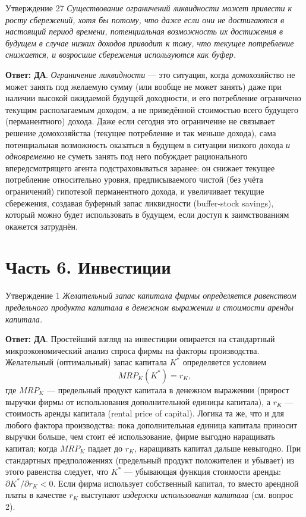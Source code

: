 \documentclass[10pt,a4paper]{article}
\newcommand{\qda}{\textbf{\color{yesgreen}Ответ: ДА}}
\newenvironment{answer}[2]{%
  \begin{qbox}{Утверждение #1}
  \textit{#2}\par\smallskip
}{%
  \end{qbox}\vspace{2pt}
}
\begin{document}
\begin{answer}{27}{Существование ограничений ликвидности может привести к росту сбережений, хотя бы потому, что даже если они не достигаются в настоящий период времени, потенциальная возможность их достижения в будущем в случае низких доходов приводит к тому, что текущее потребление снижается, и возросшие сбережения используются как буфер.}
\qda. \emph{Ограничение ликвидности} — это ситуация, когда домохозяйство не может занять под желаемую сумму (или вообще не может занять) даже при наличии высокой ожидаемой будущей доходности, и его потребление ограничено текущим располагаемым доходом, а не приведённой стоимостью всего будущего (перманентного) дохода. Даже если сегодня это ограничение не связывает решение домохозяйства (текущее потребление и так меньше дохода), сама потенциальная возможность оказаться в будущем в ситуации низкого дохода \emph{и одновременно} не суметь занять под него побуждает рационального впередсмотрящего агента подстраховываться заранее: он снижает текущее потребление относительно уровня, предписываемого чистой (без учёта ограничений) гипотезой перманентного дохода, и увеличивает текущие сбережения, создавая буферный запас ликвидности (buffer-stock savings), который можно будет использовать в будущем, если доступ к заимствованиям окажется затруднён.
\end{answer}

\newpage
\section{Часть 6. Инвестиции}

\begin{answer}{1}{Желательный запас капитала фирмы определяется равенством предельного продукта капитала в денежном выражении и стоимости аренды капитала.}
\qda. Простейший взгляд на инвестиции опирается на стандартный микроэкономический анализ спроса фирмы на факторы производства. Желательный (оптимальный) запас капитала $K^*$ определяется условием
\[
MRP_K(K^*) = r_K,
\]
где $MRP_K$ --- предельный продукт капитала в денежном выражении (прирост выручки фирмы от использования дополнительной единицы капитала), а $r_K$ --- стоимость аренды капитала (rental price of capital). Логика та же, что и для любого фактора производства: пока дополнительная единица капитала приносит выручки больше, чем стоит её использование, фирме выгодно наращивать капитал; когда $MRP_K$ падает до $r_K$, наращивать капитал дальше невыгодно. При стандартных предположениях (предельный продукт положителен и убывает) из этого равенства следует, что $K^*$ --- убывающая функция стоимости аренды: $\partial K^*/\partial r_K<0$. Если фирма использует собственный капитал, то вместо арендной платы в качестве $r_K$ выступают \emph{издержки использования капитала} (см. вопрос 2).
\end{answer}
\end{document}

